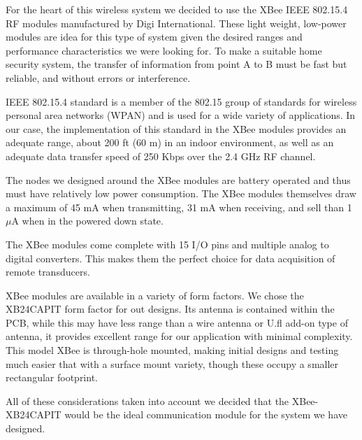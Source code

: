 \par For the heart of this wireless system we decided to use the XBee IEEE 802.15.4 RF modules manufactured by Digi International. These light weight, low-power modules are idea for this type of system given the desired ranges and performance characteristics we were looking for. To make a suitable home security system, the transfer of information from point A to B must be fast but reliable, and without errors or interference.
 \par IEEE 802.15.4 standard is a member of the 802.15 group of standards for wireless personal area networks (WPAN) and is used for a wide variety of applications. In our case, the implementation of this standard in the XBee modules provides an adequate range, about 200 ft (60 m) in an indoor environment, as well as an adequate data transfer speed of 250 Kbps over the 2.4 GHz RF channel.     
\par The nodes we designed around the XBee modules are battery operated and thus must have relatively low power consumption. The XBee modules themselves draw a maximum of 45 mA when transmitting, 31 mA when receiving, and sell than 1 $\mu$A when in the powered down state. 
\par The XBee modules come complete with 15 I/O pins and multiple analog to digital converters. This makes them the perfect choice for data acquisition of remote transducers. 
\par XBee modules are available in a variety of form factors. We chose the XB24CAPIT form factor for out designs. Its antenna is contained within the PCB, while this may have less range than a wire antenna or U.fl add-on type of antenna, it provides excellent range for our application with minimal complexity. This model XBee is through-hole mounted, making initial designs and testing much easier that with a surface mount variety, though these occupy a smaller rectangular footprint. 
\par All of these considerations taken into account we decided that the XBee-XB24CAPIT would be the ideal communication module for the system we have designed. \\